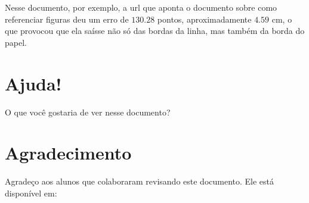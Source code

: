 \documentclass{article}
\begin{document}
Nesse documento, por exemplo, a url que aponta o documento sobre como referenciar figuras deu um erro de $130.28$ pontos, aproximadamente $4.59$ cm, o que provocou que ela saísse não só das bordas da linha, mas também da borda do papel.


\section{Ajuda!}
O que você gostaria de ver nesse documento? 


\section{Agradecimento}
Agradeço aos alunos que colaboraram revisando este documento. Ele está disponível em: 

\printbibliography
\end{document}
